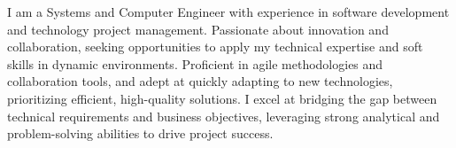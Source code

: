 I am a Systems and Computer Engineer with experience in software development and technology project management. Passionate about innovation and collaboration, seeking opportunities to apply my technical expertise and soft skills in dynamic environments. Proficient in agile methodologies and collaboration tools, and adept at quickly adapting to new technologies, prioritizing efficient, high-quality solutions. I excel at bridging the gap between technical requirements and business objectives, leveraging strong analytical and problem-solving abilities to drive project success.
